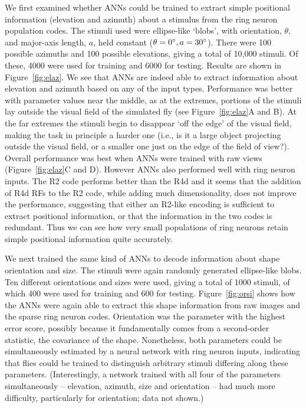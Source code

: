 \documentclass[10pt]{article}
\begin{document}
We first examined whether ANNs could be trained to extract simple positional information (elevation and azimuth) about a stimulus from the ring neuron population codes. 
The stimuli used were ellipse-like `blobs', with orientation, $\theta$, and major-axis length, $a$, held constant ($\theta = 0\degree, a = 30\degree$).
There were 100 possible azimuths and 100 possible elevations, giving a total of 10,000 stimuli.
Of these, 4000 were used for training and 6000 for testing.
Results are shown in Figure~\ref{fig:elaz}.
We see that ANNs are indeed able to extract information about elevation and azimuth based on any of the input types.
Performance was better with parameter values near the middle, as at the extremes, portions of the stimuli lay outside the visual field of the simulated fly (see Figure~\ref{fig:elaz}A and B).
At the far extremes the stimuli begin to disappear `off the edge' of the visual field, making the task in principle a harder one (i.e., is it a large object projecting outside the visual field, or a smaller one just on the edge of the field of view?).
Overall performance was best when ANNs were trained with raw views (Figure~\ref{fig:elaz}C and D). However ANNs also performed well with ring neuron inputs. The R2 code performs better than the R4d and it seems that the addition of R4d \acp{RF} to the R2 code, while adding much dimensionality, does not improve the performance, suggesting that either an R2-like encoding is sufficient to extract positional information, or that the information in the two codes is redundant. Thus we can see how very small populations of ring neurons retain simple positional information quite accurately.

We next trained the same kind of ANNs to decode information about shape orientation and size. The stimuli were again randomly generated ellipse-like blobs. Ten different orientations and sizes were used, giving a total of 1000 stimuli, of which 400 were used for training and 600 for testing. Figure~\ref{fig:orsi} shows how the ANNs were again able to extract this shape information from raw images and the sparse ring neuron codes. Orientation was the parameter with the highest error score, possibly because it fundamentally comes from a second-order statistic, the covariance of the shape. Nonetheless, both parameters could be simultaneously estimated by a neural network with ring neuron inputs, indicating that flies could be trained to distinguish arbitrary stimuli differing along these parameters.
(Interestingly, a network trained with all four of the parameters simultaneously -- elevation, azimuth, size and orientation -- had much more difficulty, particularly for orientation; data not shown.)
\end{document}
